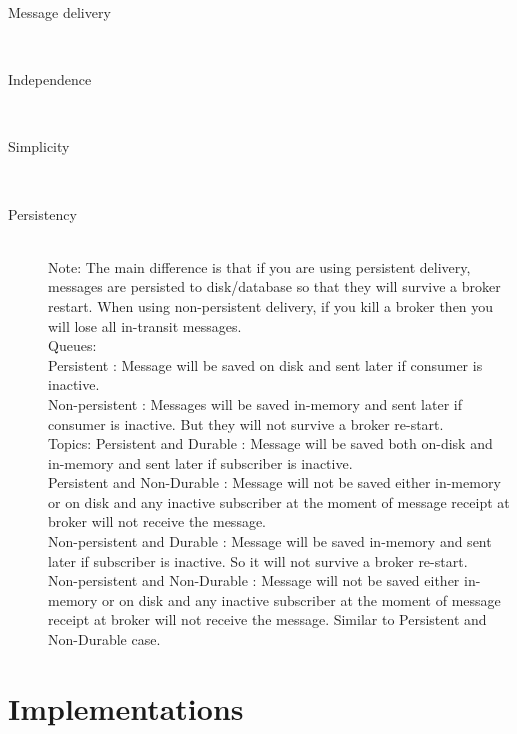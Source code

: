 \begin{description}
    \item [Message delivery] \hfill \\
    {}
\item [Independence] \hfill \\
    {}
\item [Simplicity] \hfill \\
    {}
    \item [Persistency] \hfill \\ 
        Note: The main difference is that if you are using
        persistent delivery, messages are persisted to disk/database so that
        they will survive a broker restart. When using non-persistent delivery,
        if you kill a broker then you will lose all in-transit messages. \\
        Queues: \\
        Persistent : Message will be saved on disk and sent later if consumer is inactive.\\
        Non-persistent : Messages will be saved in-memory and sent later if
        consumer is inactive. But they will not survive a broker re-start. \\
        Topics: 
        Persistent and Durable : Message will be saved both on-disk and in-memory
        and sent later if subscriber is inactive.\\
        Persistent  and  Non-Durable :
        Message will not be saved either in-memory or on disk and any inactive
        subscriber at the moment of message receipt at broker will not receive
        the message.\\
        Non-persistent and Durable : Message will be saved
        in-memory and sent later if subscriber is inactive. So it will not
        survive a broker re-start.\\
        Non-persistent and Non-Durable : Message
        will not be saved either in-memory or on disk and any inactive
        subscriber at the moment of message receipt at broker will not receive
        the message. Similar to Persistent and Non-Durable case.\\


\end{description}
\section{Implementations}


